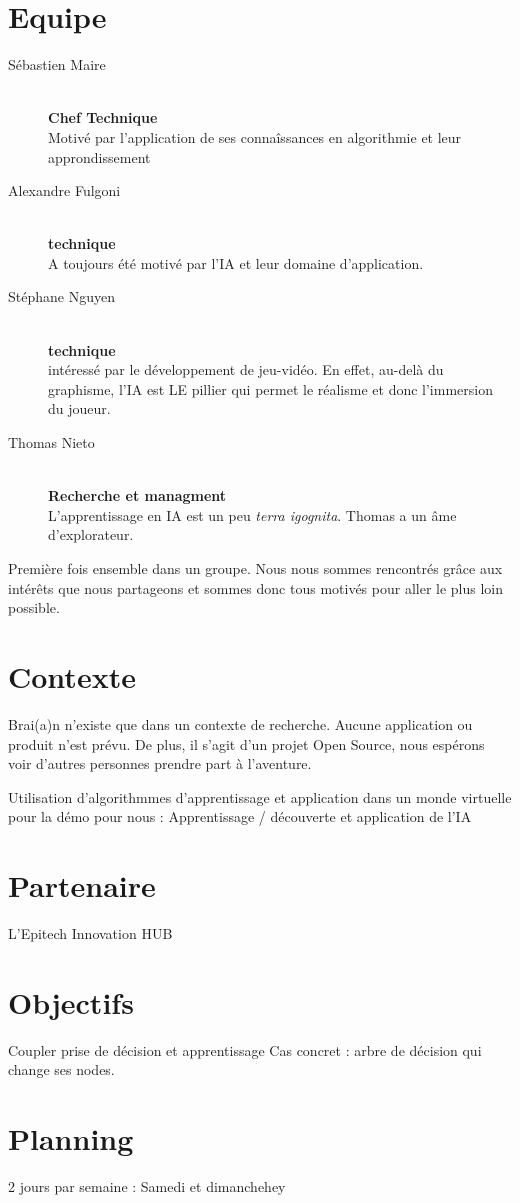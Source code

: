 \documentclass[a4paper]{report}
\begin{document}
  \section{Equipe}
    \begin{description}
      \item[Sébastien Maire] \hfill \\
        \textbf{Chef Technique} \\
        Motivé par l'application de ses connaîssances en algorithmie et leur approndissement
      \item[Alexandre Fulgoni] \hfill \\
        \textbf{technique} \\
        A toujours été motivé par l'IA et leur domaine d'application.
      \item[Stéphane Nguyen] \hfill \\
        \textbf{technique} \\
        intéressé par le développement de jeu-vidéo. En effet,
        au-delà du graphisme, l’IA est LE pillier qui permet le réalisme
        et donc l’immersion du joueur.
      \item[Thomas Nieto] \hfill \\
        \textbf{Recherche et managment} \\
        L'apprentissage en IA est un peu \textit{terra igognita}. Thomas a un âme d'explorateur.
    \end{description}

    \noindent
    Première fois ensemble dans un groupe. Nous nous sommes rencontrés grâce aux
    intérêts que nous partageons et sommes donc tous motivés pour aller le plus
    loin possible.

  \section{Contexte}
    Brai(a)n n'existe que dans un contexte de recherche. Aucune application ou produit
    n'est prévu. De plus, il s'agit d'un projet Open Source, nous espérons voir d'autres personnes prendre part à l'aventure.

    
    Utilisation d’algorithmmes d’apprentissage et application dans un monde
    virtuelle pour la démo pour nous : Apprentissage / découverte et
    application de l’IA

  \section{Partenaire}
    L'Epitech Innovation HUB

  \section{Objectifs}
    Coupler prise de décision et apprentissage
    Cas concret : arbre de décision qui change ses nodes.


  \section{Planning}
    2 jours par semaine : Samedi et dimanchehey
\end{document}
